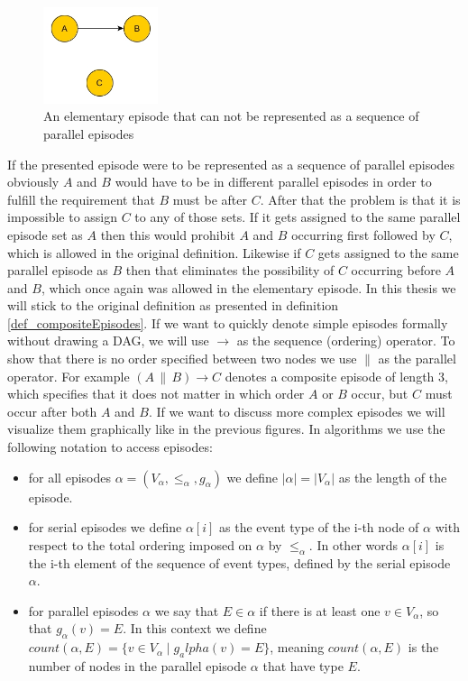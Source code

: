 \begin{figure}[h]
	\centering
  	\includegraphics[width=0.3\textwidth]{notSequenceOfSet}
	\caption{An elementary episode that can not be represented as a sequence of parallel episodes}
	\label{fig_notSequenceOfSet}
\end{figure}

If the presented episode were to be represented as a sequence of parallel episodes obviously $A$ and $B$ would have to be in different parallel episodes in order to fulfill the requirement that $B$ must be after $C$. After that the problem is that it is impossible to assign $C$ to any of those sets. If it gets assigned to the same parallel episode set as $A$ then this would prohibit $A$ and $B$ occurring first followed by $C$, which is allowed in the original definition. Likewise if $C$ gets assigned to the same parallel episode as $B$ then that eliminates the possibility of $C$ occurring before $A$ and $B$, which once again was allowed in the elementary episode. In this thesis we will stick to the original definition as presented in definition \ref{def_compositeEpisodes}. \newline
If we want to quickly denote simple episodes formally without drawing a DAG, we will use $\rightarrow$ as the sequence (ordering) operator. To show that there is no order specified between two nodes we use $\|$ as the parallel operator. For example $(A \, \| \, B ) \rightarrow C$ denotes a composite episode of length 3, which specifies that it does not matter in which order $A$ or $B$ occur, but $C$ must occur after both $A$ and $B$. If we want to discuss more complex episodes we will visualize them graphically like in the previous figures. \newline 
In algorithms we use the following notation to access episodes:

\begin{itemize}
	\item for all episodes $\alpha = (V_\alpha,{\leq}_{\alpha},g_\alpha)$ we define $|\alpha | = |V_\alpha|$ as the length of the episode.
	\item for serial episodes we define $\alpha [i]$ as the event type of the i-th node of $\alpha$ with respect to the total ordering imposed on $\alpha$ by ${\leq}_{\alpha}$. In other words $\alpha [i]$ is the i-th element of the sequence of event types, defined by the serial episode $\alpha$.
	\item for parallel episodes $\alpha$ we say that $E \in \alpha$ if there is at least one $v \in V_\alpha$, so that $g_\alpha(v) = E$. In this context we define $count(\alpha,E)= \{v \in V_\alpha \mid g_alpha(v) = E\}$, meaning $count(\alpha,E)$ is the number of nodes in the parallel episode $\alpha$ that have type $E$.
\end{itemize}


